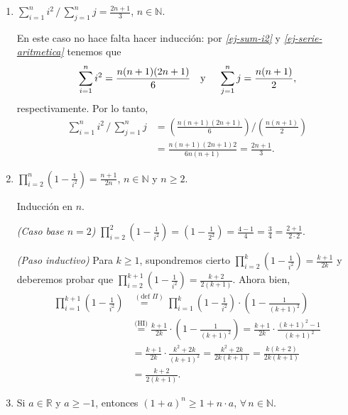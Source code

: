 \begin{enumerate}
\begin{enumerate}
        \item $\displaystyle{ \sum_{i=1}^n i^2\, /\, \sum_{j=1}^n j = \frac{2n+1}{3}}$, $n\in \mathbb N$.
        
        \rta En  este caso no hace falta hacer inducción: por \textit{ \ref{ej-sum-i2}} y \textit{\ref{ej-serie-aritmetica}} tenemos que 
        \begin{equation*}
            \sum_{i=1}^n i^2 = \frac{n(n+1)(2n+1)}{6} \text{\quad y \quad} \sum_{j=1}^n j = \frac{n(n+1)}{2},
        \end{equation*}
        respectivamente. Por  lo tanto, 
        \begin{align*}
            \sum_{i=1}^n i^2\, /\, \sum_{j=1}^n j &= \left(\frac{n(n+1)(2n+1)}{6}\right) / \left(\frac{n(n+1)}{2}\right) \\
            &= \frac{n(n+1)(2n+1)2}{6n(n+1)} = \frac{2n+1}{3}.
        \end{align*}
        
        
        \item $\displaystyle{ \prod_{i=2}^n \left(1-\frac{1}{i^2}\right) = \frac{n+1}{2n}}$, $n\in \mathbb N$ y $ n\ge 2$.
        
        \rta Inducción en $n$.
        
        \textit{(Caso base $n=2$)} $\prod_{i=2}^2 \left(1-\frac{1}{i^2}\right) = (1- \frac{1}{2^2}) = \frac{4-1}{4} = \frac{3}{4} = \frac{2+1}{2 \cdot 2}$.
        
        \textit{(Paso inductivo)} Para  $k \ge 1$,  supondremos cierto $\prod_{i=2}^k \left(1-\frac{1}{i^2}\right) = \frac{k+1}{2k}$ y  deberemos probar  que $\prod_{i=2}^{k+1} \left(1-\frac{1}{i^2}\right) = \frac{k+2}{2(k+1)}$. Ahora bien,
        \begin{align*}
        \prod_{i=1}^{k+1}\left(1-\frac{1}{i^2}\right) &\overset{(\text{def } \Pi)}{=\quad} \prod_{i=1}^k \left(1-\frac{1}{i^2}\right) \cdot \left(1-\frac{1}{(k+1)^2}\right)\\ &\overset{\text{(HI)}}{=}  \frac{k+1}{2k} \cdot\left(1-\frac{1}{(k+1)^2}\right)
        =  \frac{k+1}{2k} \cdot\frac{(k+1)^2- 1}{(k+1)^2} \\
        &= \frac{k+1}{2k} \cdot\frac{k^2+2k}{(k+1)^2} = \frac{k^2+2k}{2k (k+1)} = \frac{k(k+2)}{2k (k+1)} \\
        &=  \frac{k+2}{2 (k+1)}.
        \end{align*}
        
        \item Si $a\in \mathbb R$ y $a\geq -1$, entonces $(1+a)^n\geq 1+n\cdot a$, $\forall \, n \in \mathbb N$.
        

\end{enumerate}
\end{enumerate}
